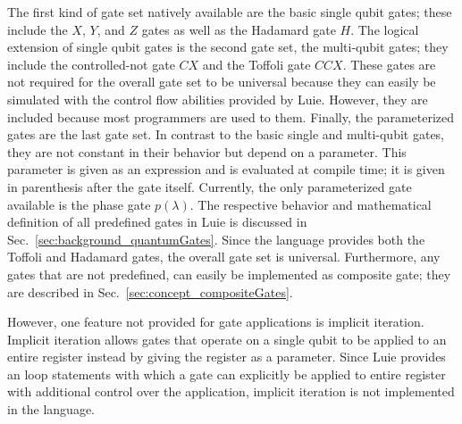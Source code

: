 The first kind of gate set natively available are the basic single qubit gates; these include the $X$, $Y$, and $Z$ gates as well as the Hadamard gate $H$. The logical extension of single qubit gates is the second gate set, the multi-qubit gates; they include the controlled-not gate $CX$ and the Toffoli gate $CCX$. These gates are not required for the overall gate set to be universal because they can easily be simulated with the control flow abilities provided by Luie. However, they are included because most programmers are used to them.
Finally, the parameterized gates are the last gate set. In contrast to the basic single and multi-qubit gates, they are not constant in their behavior but depend on a parameter. This parameter is given as an expression and is evaluated at compile time; it is given in parenthesis after the gate itself. Currently, the only parameterized gate available is the phase gate $p(\lambda)$.
The respective behavior and mathematical definition of all predefined gates in Luie is discussed in Sec.~\ref{sec:background_quantumGates}. Since the language provides both the Toffoli and Hadamard gates, the overall gate set is universal. Furthermore, any gates that are not predefined, can easily be implemented as composite gate; they are described in Sec.~\ref{sec:concept_compositeGates}.

However, one feature not provided for gate applications is implicit iteration. Implicit iteration allows gates that operate on a single qubit to be applied to an entire register instead by giving the register as a parameter. Since Luie provides an loop statements with which a gate can explicitly be applied to entire register with additional control over the application, implicit iteration is not implemented in the language.  

